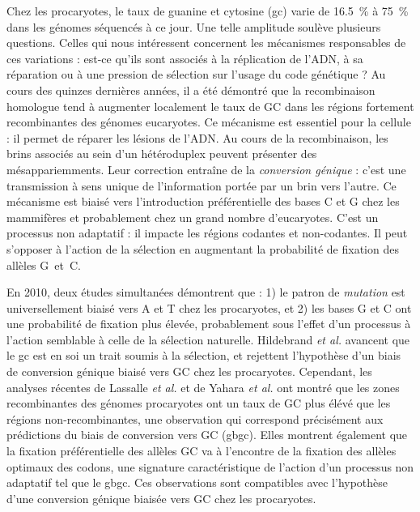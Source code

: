 Chez les procaryotes, le taux de guanine et cytosine (\ac{gc}) varie de
\SI{16.5}{\percent} à \SI{75}{\percent} dans les génomes séquencés à ce jour.
Une telle amplitude soulève plusieurs questions. Celles qui nous intéressent
concernent les mécanismes responsables de ces variations : est-ce qu'ils sont
associés à la réplication de l'ADN, à sa réparation ou à une pression de
sélection sur l'usage du code génétique ? Au cours des quinzes dernières années,
il a été démontré que la recombinaison homologue tend à augmenter localement le
taux de GC dans les régions fortement recombinantes des génomes
eucaryotes\cite{duret_biased_2009, lesecque_gc-biased_2013,
  williams_non-crossover_2015}. Ce mécanisme est essentiel pour la cellule : il
permet de réparer les lésions de l'ADN. Au cours de la recombinaison, les brins
associés au sein d'un hétéroduplex peuvent présenter des mésappariemments. Leur
correction entraîne de la \emph{conversion génique}\cite{chen_gene_2007} : c'est
une transmission à sens unique de l'information portée par un brin vers l'autre.
Ce mécanisme est biaisé vers l'introduction préférentielle des bases C et G chez
les mammifères et probablement chez un grand nombre
d'eucaryotes\cite{pessia_evidence_2012}. C'est un processus non adaptatif : il
impacte les régions codantes et non-codantes. Il peut s'opposer à l'action de la
sélection en augmentant la probabilité de fixation des allèles
G~et~C\cite{ratnakumar_detecting_2010, galtier_gc-biased_2009}.

En 2010, deux études simultanées\cite{hildebrand_evidence_2010,
  hershberg_evidence_2010} démontrent que : 1) le patron de \emph{mutation} est
universellement biaisé vers A et T chez les procaryotes, et 2) les bases G et C
ont une probabilité de fixation plus élevée, probablement sous l'effet d'un
processus à l'action semblable à celle de la sélection naturelle. Hildebrand
\emph{et al.} avancent que le \ac{gc} est en soi un trait soumis à la sélection,
et rejettent l'hypothèse d'un biais de conversion génique biaisé vers GC chez
les procaryotes. Cependant, les analyses récentes de Lassalle \emph{et al.}
\cite{lassalle_gc-content_2015} et de Yahara \emph{et
  al.}\cite{yahara_landscape_2016} ont montré que les zones recombinantes des
génomes procaryotes ont un taux de GC plus élévé que les régions
non-recombinantes, une observation qui correspond précisément aux prédictions du
biais de conversion vers GC (\ac{gbgc}). Elles montrent également que la
fixation préférentielle des allèles GC va à l'encontre de la fixation des
allèles optimaux des codons, une signature caractéristique de l'action d'un
processus non adaptatif tel que le \ac{gbgc}. Ces observations sont compatibles
avec l'hypothèse d'une conversion génique biaisée vers GC chez les procaryotes.

